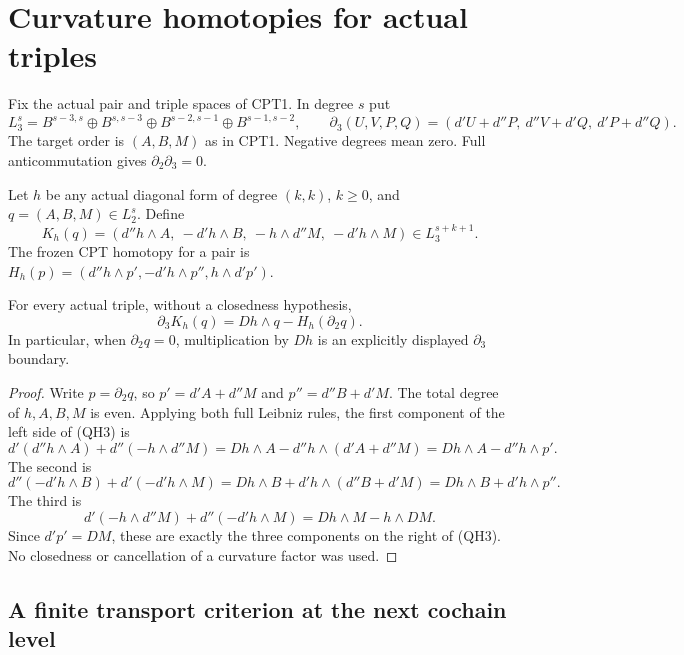 \section{Curvature homotopies for actual triples}
\label{sec:r10-triple-curvature-homotopy}

Fix the actual pair and triple spaces of CPT1.  In degree $s$ put
\[
 L_3^s=
 B^{s-3,s}\oplus B^{s,s-3}
       \oplus B^{s-2,s-1}\oplus B^{s-1,s-2},
 \qquad
 \partial_3(U,V,P,Q)=
       (d'U+d''P,\ d''V+d'Q,\ d'P+d''Q).
 \tag{QH1}
\]
The target order is $(A,B,M)$ as in CPT1.  Negative degrees mean
zero.  Full anticommutation gives $\partial_2\partial_3=0$.

Let $h$ be any actual diagonal form of degree $(k,k)$, $k\ge0$,
and $q=(A,B,M)\in L_2^s$.  Define
\[
 K_h(q)=
       (d''h\wedge A,\ -d'h\wedge B,\
                         -h\wedge d''M,\ -d'h\wedge M)
                         \in L_3^{s+k+1}.
 \tag{QH2}
\]
The frozen CPT homotopy for a pair is
$H_h(p)=(d''h\wedge p',-d'h\wedge p'',h\wedge d'p')$.

\begin{theorem}
For every actual triple, without a closedness hypothesis,
\[
             \partial_3K_h(q)=Dh\wedge q-H_h(\partial_2q).
 \tag{QH3}
\]
In particular, when $\partial_2q=0$, multiplication by $Dh$
is an explicitly displayed $\partial_3$ boundary.
\end{theorem}

\begin{proof}
Write $p=\partial_2q$, so
$p'=d'A+d''M$ and $p''=d''B+d'M$.  The total degree of
$h,A,B,M$ is even.  Applying both full Leibniz rules, the first
component of the left side of (QH3) is
\[
 d'(d''h\wedge A)+d''(-h\wedge d''M)
       =Dh\wedge A-d''h\wedge(d'A+d''M)
       =Dh\wedge A-d''h\wedge p'.
 \tag{QH4}
\]
The second is
\[
 d''(-d'h\wedge B)+d'(-d'h\wedge M)
       =Dh\wedge B+d'h\wedge(d''B+d'M)
       =Dh\wedge B+d'h\wedge p''.
 \tag{QH5}
\]
The third is
\[
 d'(-h\wedge d''M)+d''(-d'h\wedge M)
               =Dh\wedge M-h\wedge DM.
 \tag{QH6}
\]
Since $d'p'=DM$, these are exactly the three components on
the right of (QH3).  No closedness or cancellation of a curvature
factor was used.
\end{proof}

\subsection{A finite transport criterion at the next cochain level}

